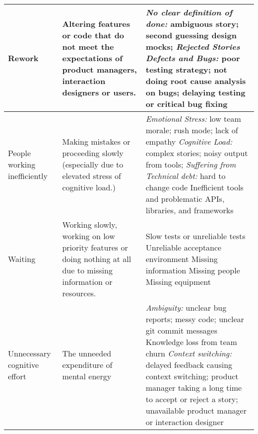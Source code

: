 \begin{table*}[t]
\begin{tabular}{|p{1.7in}|p{2.2in}|p{3in}|}
Rework                                & Altering features or code that do not meet the expectations of product managers, interaction designers or users.    & \textit{No clear definition of done:} ambiguous story; second guessing design mocks; \newline \textit{Rejected Stories} \newline \textit{Defects and Bugs:} poor testing strategy; not doing root cause analysis on bugs; delaying testing or critical bug fixing                                                                                                                                                                    \\ \hline
People working inefficiently          & Making mistakes or proceeding slowly (especially due to elevated stress of cognitive load.)                         & \textit{Emotional Stress:} low team morale; rush mode; lack of empathy \newline \textit{Cognitive Load:} complex stories; noisy output from tools; \newline \textit{Suffering from Technical debt:} hard to change code  \newline Inefficient tools and problematic APIs, libraries, and frameworks                                                                                                                                                              \\ \hline
Waiting                               & Working slowly, working on low priority features or doing nothing at all due to missing information or resources.   & Slow tests or unreliable tests \newline Unreliable acceptance environment \newline Missing information \newline Missing people \newline Missing equipment                                                                                                                                                                                                                                                                            \\ \hline
Unnecessary cognitive effort          &    The unneeded expenditure of mental energy                                                                                                                 & \textit{Ambiguity:} unclear bug reports; messy code; unclear git commit messages \newline Knowledge loss from team churn \newline \textit{Context switching:} delayed feedback causing context switching; product manager taking a long time to accept or reject a story; unavailable product manager or interaction designer                                                                      \\ \hline

\end{tabular}
\end{table*}
